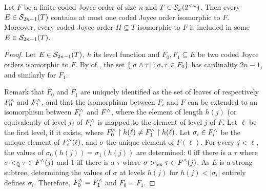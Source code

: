 \begin{lemma}\label{lem:coded-joyce-order-to-strong-subtree}
Let $F$ be a finite coded Joyce order of size $n$ and $T \in \mathcal{S}_{\omega}({2^{<\omega}})$.
Then every $E \in \mathcal{S}_{2n-1}({T})$ contains at most one coded Joyce order isomorphic to $F$. Moreover, every coded Joyce order $H \subseteq T$ isomorphic to $F$
	is included in some $E \in \mathcal{S}_{2n-1}({T})$.
\end{lemma}
\begin{proof}
  Let $E\in\mathcal{S}_{2n-1}({T})$, $h$ its level function and $F_0, F_1\subseteq E$ be two coded Joyce orders isomorphic to $F$. By  of , the set $\{|\sigma\wedge\tau|:\sigma,\tau\in F_0\}$ has cardinality $2n-1$, %
  and similarly for $F_1$.  %

  Remark that $F_0$ and $F_1$ are uniquely identified as the set of leaves of respectively ${F}^{\wedge}_0$ and ${F}^{\wedge}_1$, and that the isomorphism between $F_i$ and $F$ can be extended to an isomorphism between ${F}^{\wedge}_i$ and ${F}^{\wedge}$, where the element of length $h(j)$ (or equivalently of level $j$) of ${F}^{\wedge}_i$ is mapped to the element of level $j$ of $F$. Let $\ell$ be the first level, if it exists, where ${F}^{\wedge}_0\upharpoonright h(\ell)\neq{F}^{\wedge}_1\upharpoonright h(\ell)$. Let $\sigma_i\in {F}^{\wedge}_i$ be the unique element of ${F}^{\wedge}_i(\ell)$, and $\sigma$ the unique element of $F(\ell)$. For every $j<\ell$, the values of $\sigma_0(h(j))=\sigma_1(h(j))$ are determined: 0 iff there is a $\tau$ where $\sigma<_{\mathbb{Q}}\tau\in {F}^{\wedge}(j)$ and 1 iff there is a $\tau$ where $\sigma>_{\mathrm{lex}}\tau\in {F}^{\wedge}(j)$. %
    As $E$ is a strong subtree, determining the values of $\sigma$ at levels $h(j)$ for $h(j)<|\sigma_i|$ entirely defines $\sigma_i$.
  Therefore, ${F}^{\wedge}_0={F}^{\wedge}_1$ and $F_0=F_1$.



\end{proof}
